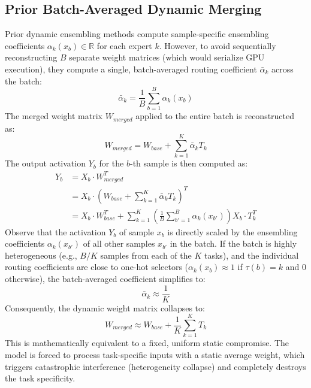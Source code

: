 \documentclass{article}
\theoremstyle{plain}
\theoremstyle{definition}
\theoremstyle{remark}
\begin{document}
\subsection{Prior Batch-Averaged Dynamic Merging}
Prior dynamic ensembling methods compute sample-specific ensembling coefficients $\alpha_k(x_b) \in \mathbb{R}$ for each expert $k$. However, to avoid sequentially reconstructing $B$ separate weight matrices (which would serialize GPU execution), they compute a single, batch-averaged routing coefficient $\bar{\alpha}_k$ across the batch:
\begin{equation}
    \bar{\alpha}_k = \frac{1}{B} \sum_{b=1}^B \alpha_k(x_b)
\end{equation}
The merged weight matrix $W_{merged}$ applied to the entire batch is reconstructed as:
\begin{equation}
    W_{merged} = W_{base} + \sum_{k=1}^K \bar{\alpha}_k T_k
\end{equation}
The output activation $Y_b$ for the $b$-th sample is then computed as:
\begin{align}
    Y_b &= X_b \cdot W_{merged}^T \nonumber\\
        &= X_b \cdot \left( W_{base} + \sum_{k=1}^K \bar{\alpha}_k T_k \right)^T \nonumber\\
        &= X_b \cdot W_{base}^T + \sum_{k=1}^K \left( \frac{1}{B} \sum_{b'=1}^B \alpha_k(x_{b'}) \right) X_b \cdot T_k^T
\end{align}
Observe that the activation $Y_b$ of sample $x_b$ is directly scaled by the ensembling coefficients $\alpha_k(x_{b'})$ of all other samples $x_{b'}$ in the batch. 
If the batch is highly heterogeneous (e.g., $B/K$ samples from each of the $K$ tasks), and the individual routing coefficients are close to one-hot selectors ($\alpha_k(x_b) \approx 1$ if $\tau(b) = k$ and $0$ otherwise), the batch-averaged coefficient simplifies to:
\begin{equation}
    \bar{\alpha}_k \approx \frac{1}{K}
\end{equation}
Consequently, the dynamic weight matrix collapses to:
\begin{equation}
    W_{merged} \approx W_{base} + \frac{1}{K} \sum_{k=1}^K T_k
\end{equation}
This is mathematically equivalent to a fixed, uniform static compromise. The model is forced to process task-specific inputs with a static average weight, which triggers catastrophic interference (heterogeneity collapse) and completely destroys the task specificity.
\end{document}
